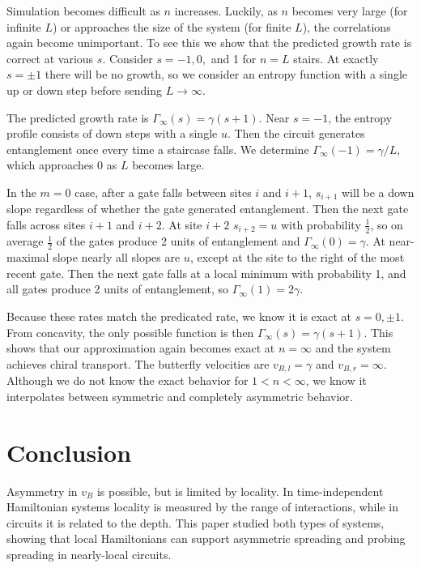 \documentclass[aps,prx,reprint,superscriptaddress, longbibliography]{revtex4-1}
\newcommand{\half}{\frac{1}{2}}
\begin{document}
Simulation becomes difficult as $n$ increases.
Luckily, as $n$ becomes very large (for infinite $L$) or approaches the size of the system (for finite $L$), the correlations again become unimportant. To see this we show that the predicted growth rate is correct at various $s$.
Consider $s = -1, 0,$ and 1 for $n=L$ stairs. At exactly $s=\pm1$ there will be no growth, so we consider an entropy function with a single up or down step before sending $L\to\infty$.

The predicted growth rate is $\Gamma_\infty(s)=\gamma(s+1)$. Near $s=-1$, the entropy profile consists of down steps with a single $u$. Then the circuit generates entanglement once every time a staircase falls. We determine $\Gamma_\infty(-1)=\gamma/L$, which approaches 0 as $L$ becomes large.

In the $m = 0$ case, after a gate falls between sites $i$ and $i + 1$, $s_{i+1}$ will be a down slope regardless of whether the gate generated entanglement. Then the next gate falls across sites $i + 1$ and $i+2$. At site $i+2$ $s_{i+2} = u$ with probability $\half$, so on average $\half$ of the gates produce 2 units of entanglement and $\Gamma_\infty(0)=\gamma$. At near-maximal slope nearly all slopes are $u$, except at the site to the right of the most recent gate. Then the next gate falls at a local minimum with probability 1, and all gates produce 2 units of entanglement, so $\Gamma_\infty(1)=2\gamma$.

Because these rates match the predicated rate, we know it is exact at $s=0, \pm1$. From concavity, the only possible function is then $\Gamma_\infty(s)=\gamma(s+1)$. This shows that our approximation again becomes exact at $n=\infty$ and the system achieves chiral transport. The butterfly velocities are $v_{B,l}=\gamma$ and $v_{B,r}=\infty$. Although we do not know the exact behavior for $1<n<\infty$, we know it interpolates between symmetric and completely asymmetric behavior.

\section{Conclusion}

Asymmetry in $v_B$ is possible, but is limited by locality. In time-independent Hamiltonian systems locality is measured by the range of interactions, while in circuits it is related to the depth. This paper studied both types of systems, showing that local Hamiltonians can support asymmetric spreading and probing spreading in nearly-local circuits. 
\end{document}
